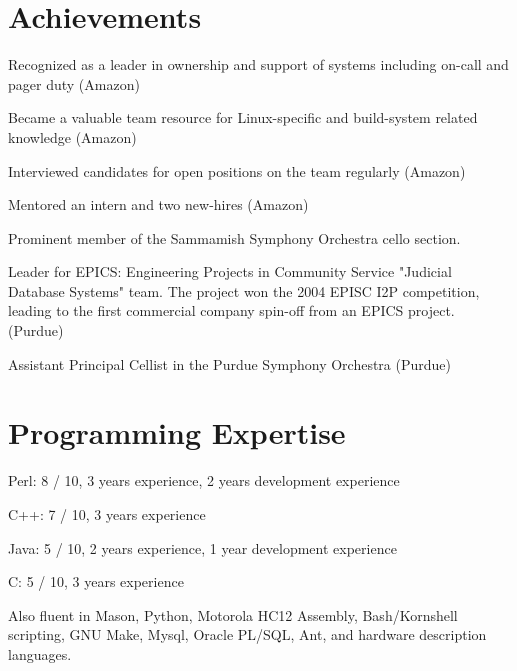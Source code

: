 \documentclass[margin,line]{resume}
\begin{document}
\begin{resume}
    \section{\mysidestyle Achievements} 

    \begin{list2} 
    \item
        Recognized as a leader in ownership and support of systems including
        on-call and pager duty (Amazon)
    \item
        Became a valuable team resource for Linux-specific and build-system related
        knowledge (Amazon)
    \item
        Interviewed candidates for open positions on the team regularly (Amazon)
    \item
        Mentored an intern and two new-hires (Amazon)
    \item
        Prominent member of the Sammamish Symphony Orchestra cello section.
    \item
        Leader for EPICS: Engineering Projects in Community Service "Judicial
        Database Systems" team.  The project won the 2004 EPISC I2P competition,
        leading to the first commercial company spin-off from an EPICS project.
        (Purdue)
    \item
        Assistant Principal Cellist in the Purdue Symphony Orchestra (Purdue)
    \end{list2}

    \section{\mysidestyle Programming Expertise} 
    \begin{list2}
    \item 
        Perl: 8 / 10, 3 years experience, 2 years development experience
    \item
        C++: 7 / 10, 3 years experience
    \item
        Java: 5 / 10, 2 years experience, 1 year development experience
    \item
        C: 5 / 10, 3 years experience
    \item
        Also fluent in Mason, Python, Motorola HC12 Assembly, Bash/Kornshell
        scripting, GNU Make, Mysql, Oracle PL/SQL, Ant, and hardware description
        languages.
    \end{list2}


\end{resume}
\end{document}
